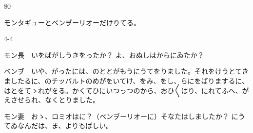\documentclass[tate,paper=b6j,jafontsize=9pt]{jlreq}
\begin{document}
\begin{azconvIndented}{8\zw}{0\zw}

モンタギューとベンヺーリオーだけりてる。

\end{azconvIndented}
\begin{azconvIndented}{4\zw}{-4\zw}

モン長　いをばがしうきをったか？ よ、おぬしはからにゐたか？

ベンヺ　いや、がったには、のととがもうにうてをりました。それをけうとてきましたるに、のチッバルトのめがをいてけ、をみ、をし、らにをばりまするに、はとをてゝれがをる。かくてひにいつっつのから、おひ{〳〵}はり、にれてふへ、がえさせられ、なくとりました。

モン妻　おゝ、ロミオはに？（ベンヺーリオーに）そなたはしましたか？ にうてゐなんだは、ま、よりもばしい。


\end{azconvIndented}
\end{document}
